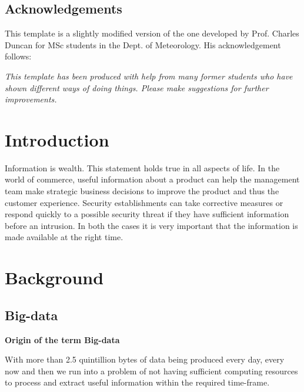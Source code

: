 \documentclass[12pt,a4paper]{report}
\begin{document}

\tableofcontents
\listoftables
\listoffigures

\begin{titlepage}
\vspace*{2in}
\section*{Acknowledgements}

This template is a slightly modified version of the one developed by
Prof. Charles Duncan for MSc students in the Dept. of Meteorology. His
acknowledgement follows:

{\em This template has been produced with help from many former students who
have shown different ways of doing things. Please make suggestions for
further improvements.}

\end{titlepage}


\chapter{Introduction}

Information is wealth. This statement holds true in all aspects of
life. In the world of commerce, useful information about a product 
can help the management team make strategic business decisions
to improve the product and thus the customer experience. Security establishments
can take corrective measures or respond quickly to a possible security threat
if they have sufficient information before an intrusion. In both the cases
it is very important that the information is made available at the right time. 

\chapter{Background}

\section{Big-data}

{\bf Origin of the term Big-data}

With more than 2.5 quintillion bytes of data \cite{ibm:bigdata} being produced
every day, every now and then we run into a problem of not having 
sufficient computing resources to process and extract useful information
within the required time-frame.
\end{document}
